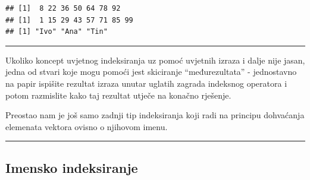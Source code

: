 \documentclass[]{book}
\newenvironment{Shaded}{\begin{snugshade}}{\end{snugshade}}
\newcommand{\KeywordTok}[1]{\textcolor[rgb]{0.13,0.29,0.53}{\textbf{#1}}}
\newcommand{\DecValTok}[1]{\textcolor[rgb]{0.00,0.00,0.81}{#1}}
\newcommand{\StringTok}[1]{\textcolor[rgb]{0.31,0.60,0.02}{#1}}
\newcommand{\CommentTok}[1]{\textcolor[rgb]{0.56,0.35,0.01}{\textit{#1}}}
\newcommand{\OperatorTok}[1]{\textcolor[rgb]{0.81,0.36,0.00}{\textbf{#1}}}
\newcommand{\NormalTok}[1]{#1}
\theoremstyle{definition}
\theoremstyle{definition}
\theoremstyle{definition}
\theoremstyle{remark}
\begin{document}
\begin{Shaded}
\end{Shaded}

\begin{verbatim}
## [1]  8 22 36 50 64 78 92
## [1]  1 15 29 43 57 71 85 99
## [1] "Ivo" "Ana" "Tin"
\end{verbatim}

\begin{center}\rule{0.5\linewidth}{\linethickness}\end{center}

Ukoliko koncept uvjetnog indeksiranja uz pomoć uvjetnih izraza i dalje
nije jasan, jedna od stvari koje mogu pomoći jest skiciranje
``međurezultata'' - jednostavno na papir ispišite rezultat izraza unutar
uglatih zagrada indeksnog operatora i potom razmislite kako taj rezultat
utječe na konačno rješenje.

Preostao nam je još samo zadnji tip indeksiranja koji radi na principu
dohvaćanja elemenata vektora ovisno o njihovom imenu.

\begin{center}\rule{0.5\linewidth}{\linethickness}\end{center}

\subsection{Imensko indeksiranje}\label{imensko-indeksiranje}
\end{document}
